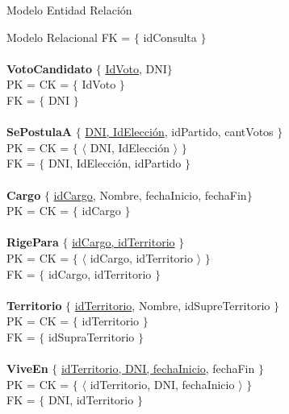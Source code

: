 \begin{section}{Modelo Entidad Relaci\'on}
\begin{subsection}{Modelo Relacional}
FK = $ \lbrace $ idConsulta $ \rbrace $\\
\\
\textbf{VotoCandidato} $ \lbrace $ \underline{IdVoto}, DNI$ \rbrace $ \\
PK = CK = $ \lbrace $  IdVoto $ \rbrace $ \\
FK = $ \lbrace $ DNI $ \rbrace $\\
\\
\textbf{SePostulaA} $ \lbrace $ \underline{DNI, IdElecci\'on}, idPartido, cantVotos $ \rbrace $ \\
PK = CK = $ \lbrace $ $ \langle $ DNI, IdElecci\'on $ \rangle $ $ \rbrace $ \\
FK = $ \lbrace $ DNI, IdElecci\'on, idPartido $ \rbrace $\\
\\
\textbf{Cargo} $ \lbrace $ \underline{idCargo}, Nombre, fechaInicio, fechaFin$ \rbrace $ \\
PK = CK = $ \lbrace $ idCargo $ \rbrace $ \\
\\
\textbf{RigePara} $ \lbrace $ \underline{idCargo, idTerritorio} $ \rbrace $ \\
PK = CK = $ \lbrace $ $ \langle $ idCargo, idTerritorio $ \rangle $ $ \rbrace $ \\
FK = $ \lbrace $ idCargo, idTerritorio $ \rbrace $\\
\\
\textbf{Territorio} $ \lbrace $ \underline{idTerritorio}, Nombre, idSupreTerritorio $ \rbrace $ \\
PK = CK = $ \lbrace $ idTerritorio $ \rbrace $ \\
FK = $ \lbrace $ idSupraTerritorio $ \rbrace $\\
\\
\textbf{ViveEn} $ \lbrace $ \underline{idTerritorio, DNI, fechaInicio}, fechaFin $ \rbrace $ \\
PK = CK = $ \lbrace $ $ \langle $ idTerritorio, DNI, fechaInicio $ \rangle $ $ \rbrace $ \\
FK = $ \lbrace $ DNI, idTerritorio $ \rbrace $\\


\end{subsection}

\end{section}
